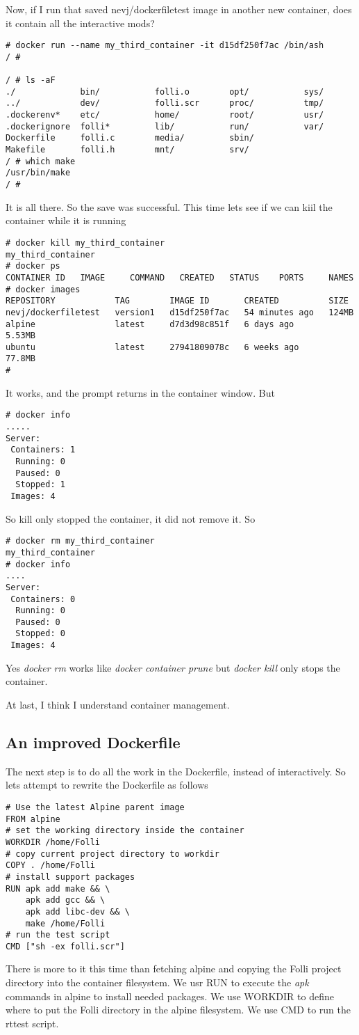 \documentclass{article}  %
\begin{document}
Now, if I run that saved nevj/dockerfiletest image in another new container, does it contain all the interactive mods?
\begin{verbatim}
# docker run --name my_third_container -it d15df250f7ac /bin/ash
/ # 

/ # ls -aF
./             bin/           folli.o        opt/           sys/
../            dev/           folli.scr      proc/          tmp/
.dockerenv*    etc/           home/          root/          usr/
.dockerignore  folli*         lib/           run/           var/
Dockerfile     folli.c        media/         sbin/
Makefile       folli.h        mnt/           srv/
/ # which make
/usr/bin/make
/ # 
\end{verbatim}
 It is all there. So the save was successful.
This time lets see if we can kiil the container while it is running
\begin{verbatim}
# docker kill my_third_container
my_third_container
# docker ps
CONTAINER ID   IMAGE     COMMAND   CREATED   STATUS    PORTS     NAMES
# docker images
REPOSITORY            TAG        IMAGE ID       CREATED          SIZE
nevj/dockerfiletest   version1   d15df250f7ac   54 minutes ago   124MB
alpine                latest     d7d3d98c851f   6 days ago       5.53MB
ubuntu                latest     27941809078c   6 weeks ago      77.8MB
# 
\end{verbatim}
It works, and the prompt returns in the container window.
But
\begin{verbatim}
# docker info
.....
Server:
 Containers: 1
  Running: 0
  Paused: 0
  Stopped: 1
 Images: 4
\end{verbatim}
So kill only stopped the container, it did not remove it. So
\begin{verbatim}
# docker rm my_third_container
my_third_container
# docker info
....
Server:
 Containers: 0
  Running: 0
  Paused: 0
  Stopped: 0
 Images: 4
\end{verbatim}
 Yes {\em docker rm} works like {\em docker container prune} but {\em docker kill} only stops the container.

At last, I think I understand container management.

\subsection{An improved  Dockerfile}
The next step is to do all the work in the Dockerfile, instead of interactively. So lets attempt to rewrite the Dockerfile as follows
\begin{verbatim}
# Use the latest Alpine parent image
FROM alpine
# set the working directory inside the container
WORKDIR /home/Folli
# copy current project directory to workdir
COPY . /home/Folli
# install support packages
RUN apk add make && \
    apk add gcc && \
    apk add libc-dev && \
    make /home/Folli
# run the test script
CMD ["sh -ex folli.scr"]
\end{verbatim}
 There is more to it this time than fetching alpine and copying the Folli project directory into the container filesystem. We usr RUN to execute the {\em apk} commands in alpine to install needed packages. We use WORKDIR to define where to put the Folli directory in the alpine filesystem. We use CMD to run the rttest script.
\end{document}
